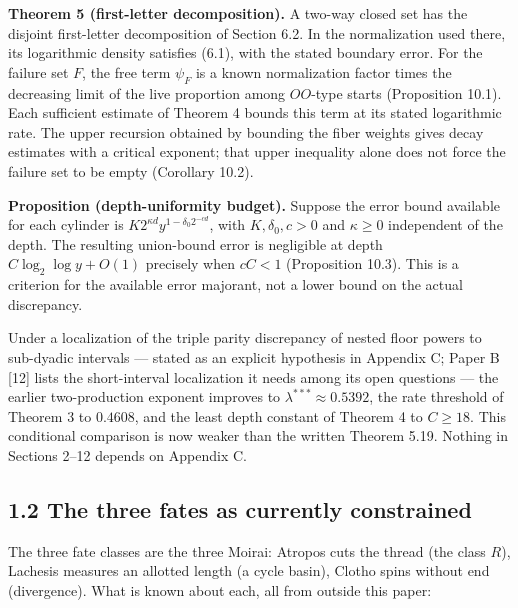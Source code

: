 \documentclass[11pt,a4paper]{article}
\begin{document}
\textbf{Theorem 5 (first-letter decomposition).} A two-way closed set
has the disjoint first-letter decomposition of Section 6.2. In the
normalization used there, its logarithmic density satisfies (6.1), with
the stated boundary error. For the failure set \(F\), the free term
\(\psi_F\) is a known normalization factor times the decreasing limit of
the live proportion among \(OO\)-type starts (Proposition 10.1). Each
sufficient estimate of Theorem 4 bounds this term at its stated
logarithmic rate. The upper recursion obtained by bounding the fiber
weights gives decay estimates with a critical exponent; that upper
inequality alone does not force the failure set to be empty (Corollary
10.2).

\textbf{Proposition (depth-uniformity budget).} Suppose the error bound
available for each cylinder is \(K2^{\kappa d}y^{1-\delta_0 2^{-cd}}\),
with \(K,\delta_0,c>0\) and \(\kappa\ge0\) independent of the depth. The
resulting union-bound error is negligible at depth
\(C\log_2\log y+O(1)\) precisely when \(cC<1\) (Proposition 10.3). This
is a criterion for the available error majorant, not a lower bound on
the actual discrepancy.

Under a localization of the triple parity discrepancy of nested floor
powers to sub-dyadic intervals --- stated as an explicit hypothesis in
Appendix C; Paper B {[}12{]} lists the short-interval localization it
needs among its open questions --- the earlier two-production exponent
improves to \(\lambda^{***}\approx0.5392\), the rate threshold of
Theorem 3 to \(0.4608\), and the least depth constant of Theorem 4 to
\(C\ge 18\). This conditional comparison is now weaker than the written
Theorem 5.19. Nothing in Sections 2--12 depends on Appendix C.

\subsection{1.2 The three fates as currently
constrained}\label{the-three-fates-as-currently-constrained}

The three fate classes are the three Moirai: Atropos cuts the thread
(the class \(R\)), Lachesis measures an allotted length (a cycle basin),
Clotho spins without end (divergence). What is known about each, all
from outside this paper:
\end{document}
